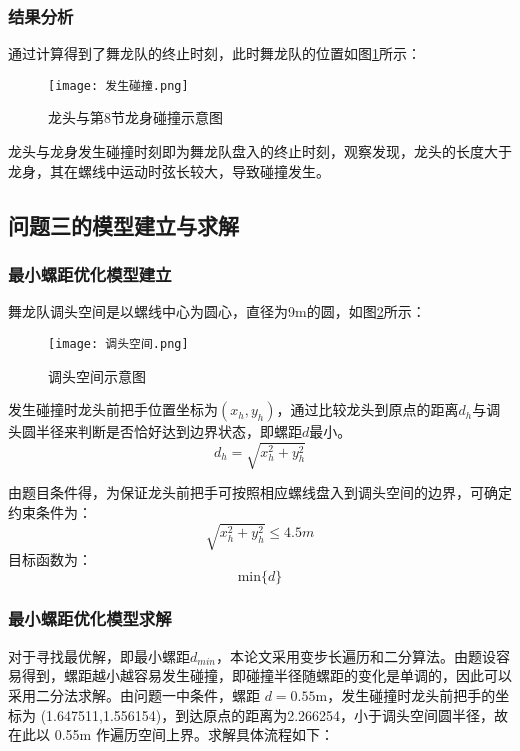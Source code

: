 \documentclass[withoutpreface,bwprint]{cumcmthesis} %
\begin{document}
	\subsubsection{结果分析}
	通过计算得到了舞龙队的终止时刻，此时舞龙队的位置如图\ref{发生碰撞}所示：
	\begin{figure}[H]
		\centering
		\texttt{[image: 发生碰撞.png]}
		\caption{龙头与第8节龙身碰撞示意图}
		\label{发生碰撞} %
	\end{figure}
	龙头与龙身发生碰撞时刻即为舞龙队盘入的终止时刻，观察发现，龙头的长度大于龙身，其在螺线中运动时弦长较大，导致碰撞发生。

	\subsection{问题三的模型建立与求解}
	\subsubsection{最小螺距优化模型建立}
	舞龙队调头空间是以螺线中心为圆心，直径为9m的圆，如图\ref{调头空间}所示：
	\begin{figure}[H]
		\centering
		\texttt{[image: 调头空间.png]}
		\caption{调头空间示意图}
		\label{调头空间} %
	\end{figure}
	发生碰撞时龙头前把手位置坐标为$(x_h,y_h)$，通过比较龙头到原点的距离$d_h$与调头圆半径来判断是否恰好达到边界状态，即螺距$d$最小。
	\begin{equation}
		d_h=\sqrt{x_h^2+y_h^2}
	\end{equation}

	由题目条件得，为保证龙头前把手可按照相应螺线盘入到调头空间的边界，可确定约束条件为：
	\begin{equation}
		\sqrt{x_h^2+y_h^2}\le4.5m
	\end{equation}
	目标函数为：
	\begin{equation}
		\mbox{min} \{d\} 
	\end{equation}
	\subsubsection{最小螺距优化模型求解}
	对于寻找最优解，即最小螺距$d_{min}$，本论文采用变步长遍历和二分算法。由题设容易得到，螺距越小越容易发生碰撞，即碰撞半径随螺距的变化是单调的，因此可以采用二分法求解。由问题一中条件，螺距 $d=0.55$m，发生碰撞时龙头前把手的坐标为 (1.647511,1.556154)，到达原点的距离为2.266254，小于调头空间圆半径，故在此以 0.55m 作遍历空间上界。求解具体流程如下：
	
\end{document}
